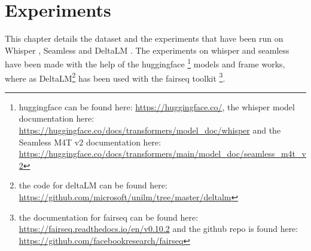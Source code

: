 
\chapter{Experiments}
\label{ch:experiment}
This chapter details the dataset and the experiments that have been run on Whisper \cite{radford2022robust}, Seamless \cite{seamless2023} and DeltaLM \cite{ma2021deltalm}.
The experiments on whisper and seamless have been made with the help of the huggingface \cite{huggingfaceseamless}\cite{huggingfacewhisper}\footnote{huggingface can be found here: \url{https://huggingface.co/}, the whisper model documentation here: \url{https://huggingface.co/docs/transformers/model_doc/whisper} and the Seamless M4T v2 documentation here: \url{https://huggingface.co/docs/transformers/main/model_doc/seamless_m4t_v2}} models and frame works, where as DeltaLM\footnote{the code for deltaLM can be found here: \url{https://github.com/microsoft/unilm/tree/master/deltalm}} has been used with the fairseq toolkit \cite{ott2019fairseqfastextensibletoolkit}\footnote{the documentation for fairseq can be found here: \url{https://fairseq.readthedocs.io/en/v0.10.2} and the github repo is found here: \url{https://github.com/facebookresearch/fairseq}}.


